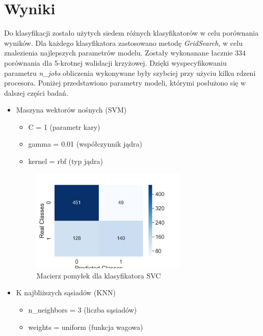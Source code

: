 \documentclass[12pt]{article}
\begin{document}
\section{Wyniki}
Do klasyfikacji zostało użytych siedem różnych klasyfikatorów w celu porównania wyników. Dla każdego klasyfikatora zastosowano metodę \textit{GridSearch}, w celu znalezienia najlepszych parametrów modelu. Zostały wykonanane łacznie $334$ porównania dla  5-krotnej walidacji krzyżowej. Dzięki wyspecyfikowaniu parametru \textit{n\_jobs} obliczenia wykonywane były szybciej przy użyciu kilku rdzeni procesora. Poniżej przedstawiono parametry modeli, którymi posłużono się w dalszej części badań.
\begin{itemize}
	\item{Maszyna wektorów nośnych (SVM)}
	\begin{itemize}
		\item{C = 1 (parametr kary)}
		\item{gamma = 0.01 (współczynnik jądra)}
		\item{kernel = rbf (typ jądra)}
	\end{itemize}
	    
	\begin{figure}[h!]
		\centering
		\includegraphics[width=0.7\textwidth]{images/confusion_svc.jpg}
		\caption{Macierz pomyłek dla klasyfikatora SVC}
		\label{fig:outliers}
	\end{figure}
	
	\item{K najbliższych sąsiadów (KNN)}
	\begin{itemize}
		\item{n\_neighbors = 3 (liczba sąsiadów)}
		\item{weights = uniform (funkcja wagowa)}
	\end{itemize}
	    

\end{itemize}
\end{document}
